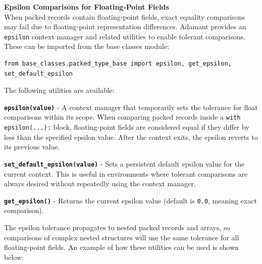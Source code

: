 \textbf{Epsilon Comparisons for Floating-Point Fields} \\

When packed records contain floating-point fields, exact equality comparisons may fail due to floating-point representation differences. Adamant provides an \texttt{epsilon} context manager and related utilities to enable tolerant comparisons. These can be imported from the base classes module:

\vspace{5mm} %
\begin{verbatim}
from base_classes.packed_type_base import epsilon, get_epsilon, set_default_epsilon
\end{verbatim}
\vspace{5mm} %

The following utilities are available:

\vspace{5mm} %
\begin{spaceditemize}
  \item \textbf{\texttt{epsilon(value)}} - A context manager that temporarily sets the tolerance for float comparisons within its scope. When comparing packed records inside a \texttt{with epsilon(...):} block, floating-point fields are considered equal if they differ by less than the specified epsilon value. After the context exits, the epsilon reverts to its previous value.
  \item \textbf{\texttt{set\_default\_epsilon(value)}} - Sets a persistent default epsilon value for the current context. This is useful in environments where tolerant comparisons are always desired without repeatedly using the context manager.
  \item \textbf{\texttt{get\_epsilon()}} - Returns the current epsilon value (default is \texttt{0.0}, meaning exact comparison).
\end{spaceditemize}
\vspace{5mm} %

The epsilon tolerance propagates to nested packed records and arrays, so comparisons of complex nested structures will use the same tolerance for all floating-point fields. An example of how these utilities can be used is shown below:

